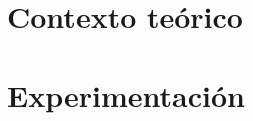 \documentclass[ twoside,openright,titlepage,numbers=noenddot,headinclude,%
                footinclude=true,cleardoublepage=empty,abstractoff, %
                BCOR=5mm,paper=a4,fontsize=11pt,%
                ngerman,american,%
                ]{scrreprt}
\begin{document}
\frenchspacing
\raggedbottom
{}
\pagestyle{plain}


%
\cleardoublepage
\cleardoublepage
\pagestyle{scrheadings}
\cleardoublepage

\part{Contexto teórico}




\part{Experimentación}




%
%
%
%
%
%
%
%
\cleardoublepage
%
\cleardoublepage
\cleardoublepage
\end{document}
